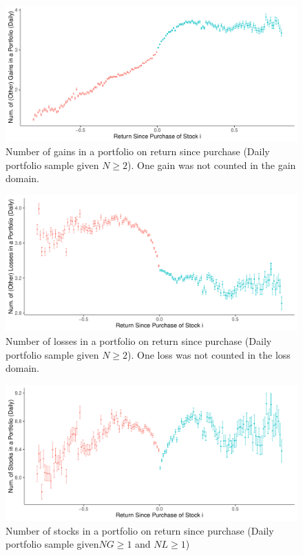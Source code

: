 \documentclass[11pt, a4paper]{article}
\begin{document}
\begin{appendices}
\begin{figure}[H]
	\centering
	\includegraphics[width=0.8\columnwidth]{barc_NG_daily_N2_3.pdf}
	\caption{\small Number of gains in a portfolio on return since purchase (Daily portfolio sample given $N\geq2$). One gain was not counted in the gain domain.}
	\label{figure:NG_on_return_n2}
\end{figure}

\begin{figure}[H]
	\centering
	\includegraphics[width=0.8\columnwidth]{barc_NL_daily_N2_3.pdf}
	\caption{\small Number of losses in a portfolio on return since purchase (Daily portfolio sample given $N\geq2$). One loss was not counted in the loss domain.}
	\label{figure:NL_on_return_n2}
\end{figure}

\pagebreak

\begin{figure}[H]
	\centering
	\includegraphics[width=0.8\columnwidth]{barc_num_stocks_daily_NG1_NL1_3.pdf}
	\caption{\small Number of stocks in a portfolio on return since purchase (Daily portfolio sample given$NG\geq1$ and $NL\geq1$)}
	\label{figure:N_on_return_ng1_nl1}
\end{figure}



\end{appendices}
\end{document}
